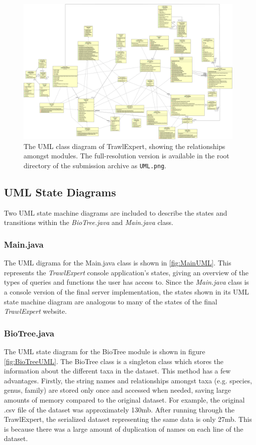 \documentclass{article}
\begin{document}
\begin{figure}
\centering
\includegraphics[angle=90,width=14cm]{ClassUML.png}
\caption{The UML class diagram of TrawlExpert, showing the relationships amongst modules. The full-resolution version is available in the root directory of the submission archive as \texttt{UML.png}.}
\label{fig:UML}
\end{figure}


\subsection{UML State Diagrams}
Two UML state machine diagrams are included to describe the states and transitions within the \textit{BioTree.java} and \textit{Main.java} class.

\subsubsection{Main.java}
The UML digrama for the Main.java class is shown in \ref{fig:MainUML}. This represents the \textit{TrawlExpert} console application's states, giving an overview of the types of queries and functions the user has access to. Since the \textit{Main.java} class is a console version of the final server implementation, the states shown in its UML state machine diagram are analogous to many of the states of the final \textit{TrawlExpert} website.
 
\subsubsection{BioTree.java}
The UML state diagram for the BioTree module is shown in figure \ref{fig:BioTreeUML}. The BioTree class is a singleton class which stores the information about the different taxa in the dataset. This method has a few advantages. Firstly, the string names and relationships amongst taxa (e.g. species, genus, family) are stored only once and accessed when needed, saving large amounts of memory compared to the original dataset. For example, the original .csv file of the dataset was approximately 130mb. After running through the TrawlExpert, the serialized dataset representing the same data is only 27mb. This is because there was a large amount of duplication of names on each line of the dataset.
\end{document}
